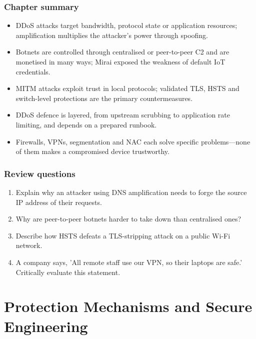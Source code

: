 \documentclass[11pt,openany]{book}
\begin{document}
\section*{Chapter summary}
\begin{itemize}
  \item DDoS attacks target bandwidth, protocol state or application resources; amplification multiplies the attacker's power through spoofing.
  \item Botnets are controlled through centralised or peer-to-peer C2 and are monetised in many ways; Mirai exposed the weakness of default IoT credentials.
  \item MITM attacks exploit trust in local protocols; validated TLS, HSTS and switch-level protections are the primary countermeasures.
  \item DDoS defence is layered, from upstream scrubbing to application rate limiting, and depends on a prepared runbook.
  \item Firewalls, VPNs, segmentation and NAC each solve specific problems—none of them makes a compromised device trustworthy.
\end{itemize}

\section*{Review questions}
\begin{enumerate}
  \item Explain why an attacker using DNS amplification needs to forge the source IP address of their requests.
  \item Why are peer-to-peer botnets harder to take down than centralised ones?
  \item Describe how HSTS defeats a TLS-stripping attack on a public Wi-Fi network.
  \item A company says, 'All remote staff use our VPN, so their laptops are safe.' Critically evaluate this statement.
\end{enumerate}

\part{Protection Mechanisms and Secure Engineering}
\end{document}
